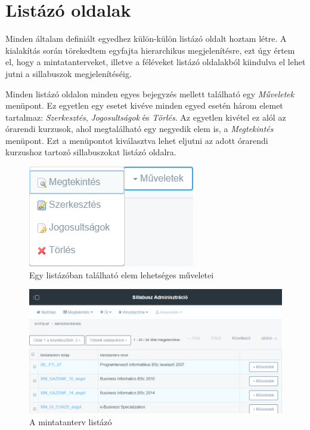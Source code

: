 \documentclass[hidelinks, 12pt, a4paper]{report}
\begin{document}
\section{Listázó oldalak}

Minden általam definiált egyedhez külön-külön listázó oldalt hoztam létre. A kialakítás során törekedtem egyfajta hierarchikus megjelenítésre, ezt úgy értem el, hogy a mintatanterveket, illetve a féléveket listázó oldalakból kiindulva el lehet jutni a sillabuszok megjelenítéséig.

Minden listázó oldalon minden egyes bejegyzés mellett található egy \emph{Műveletek} menüpont. Ez egyetlen egy esetet kivéve minden egyed esetén három elemet tartalmaz: \emph{Szerkesztés}, \emph{Jogosultságok} és \emph{Törlés}. Az egyetlen kivétel ez alól az órarendi kurzusok, ahol megtalálható egy negyedik elem is, a \emph{Megtekintés} menüpont. Ezt a menüpontot kiválasztva lehet eljutni az adott órarendi kurzushoz tartozó sillabuszokat listázó oldalra.

\begin{figure}[H]
    \centering
	\includegraphics{sm_list_actions_timetable_course.png}
	\caption{Egy listázóban található elem lehetséges műveletei}
\end{figure}

\begin{figure}[H]
    \centering
	\includegraphics[width=\textwidth]{sm_curriculum_list.png}
	\caption{A mintatanterv listázó}
\end{figure}
\end{document}
